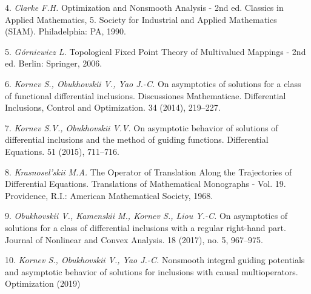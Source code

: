 4. {\it Clarke F.H.} Optimization and Nonsmooth Analysis - 2nd ed. Classics in Applied Mathematics, 5. Society for Industrial and Applied Mathematics (SIAM). Philadelphia: PA, 1990.

5. {\it G\'orniewicz L.} Topological Fixed Point Theory of Multi\-valued Mappings - 2nd ed. Berlin: Springer, 2006.

6. {\it Kornev S., Obukhovskii V., Yao J.-C.} On asymptotics of solutions for a class of functional differential inclusions. Discus\-sio\-nes Mathematicae. Differential Inclusions, Control and Opti\-mi\-zation. 34 (2014), 219--227.

7. {\it Kornev S.V., Obukhovskii V.V.} On asymptotic behavior of solutions of differential inclusions and the method of guiding functions. Differential Equations. 51 (2015), 711--716.

8. {\it Krasnosel'skii M.A.} The Operator of Translation Along the Trajectories of Differential Equations. Translations of Mathe\-ma\-tical Monographs - Vol. 19. Providence, R.I.: American Ma\-the\-matical Society, 1968.

9. {\it Obukhovskii V., Kamenskii M., Kornev S., Liou Y.-C.} On asymptotics of solutions for a class of differential inclusions with a regular right-hand part. Journal of Nonlinear and Convex Analysis. 18 (2017), no. 5, 967--975.

10. {\it Kornev S., Obukhovskii V., Yao J.-C.} Nonsmooth integral guiding potentials and asymptotic behavior of solutions for inclusions with causal multioperators. Optimization (2019)
